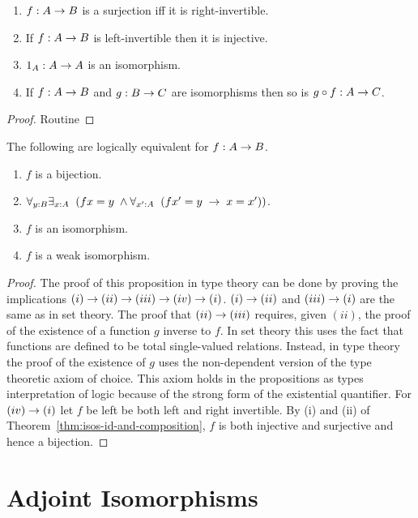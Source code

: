 \begin{thm}\label{thm:isos-id-and-composition} $\;$
\begin{enumerate}
\item $f:A\rightarrow B$ is a surjection iff it is right-invertible.
\item If $f:A\rightarrow B$ is left-invertible then it is injective.
\item $1_A:A\rightarrow A$ is an isomorphism.
\item If $f:A\rightarrow B$ and $g:B\rightarrow C$ are isomorphisms then so is $g\circ f:A\rightarrow C$.
\end{enumerate}
\end{thm}
\begin{proof} Routine
\end{proof}
\begin{thm}\label{thm:bijections-isos}
The following are logically equivalent for $f:A\rightarrow B$.
\begin{enumerate}
\item $f$ is a bijection.
\item $\forall_{y:B}\exists_{x:A}\;\; (fx=y\;\wedge \forall_{x':A}\;\; (fx'=y\;\rightarrow\; x=x'))$.
\item $f$ is an isomorphism.
\item $f$ is a weak isomorphism.
\end{enumerate}
\end{thm}
\begin{proof}
The proof of this proposition in type theory can be done by proving the implications $(i)\rightarrow (ii)\rightarrow (iii)\rightarrow (iv)\rightarrow (i)$.  $(i)\rightarrow (ii)$ and $(iii)\rightarrow (i)$ are the same as in set theory.  The proof that $(ii)\rightarrow (iii)$ requires, given $(ii)$, the proof of the existence of a function $g$ inverse to $f$.  In set theory this uses the fact that functions are defined to be total single-valued relations.  Instead, in type theory the proof of the existence of $g$
uses the non-dependent version of the type theoretic axiom of choice.  This axiom holds in the propositions as types interpretation of logic because of the strong form of the existential quantifier.  For $(iv)\rightarrow (i)$ let $f$ be left be both left and right invertible.  By (i) and (ii) of Theorem~\ref{thm:isos-id-and-composition}, $f$ is both injective and surjective and hence a bijection.  
\end{proof}
\newpage

\section{Adjoint  Isomorphisms}

